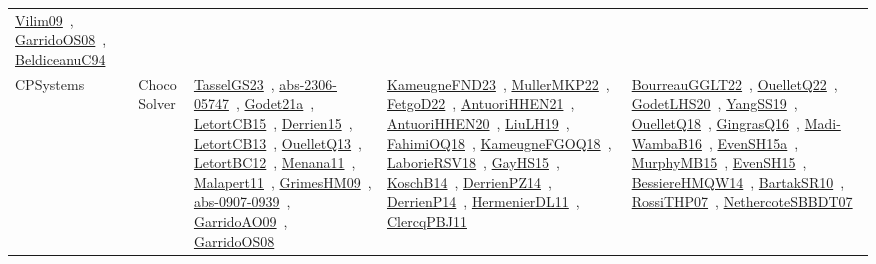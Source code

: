 {\begin{longtable}{lp{3cm}>{\raggedright\arraybackslash}p{6cm}>{\raggedright\arraybackslash}p{6cm}>{\raggedright\arraybackslash}p{8cm}}
\href{works/Vilim09.pdf}{Vilim09}~\cite{Vilim09}, \href{works/GarridoOS08.pdf}{GarridoOS08}~\cite{GarridoOS08}, \href{works/BeldiceanuC94.pdf}{BeldiceanuC94}~\cite{BeldiceanuC94}\\
CPSystems & Choco Solver & \href{works/TasselGS23.pdf}{TasselGS23}~\cite{TasselGS23}, \href{works/abs-2306-05747.pdf}{abs-2306-05747}~\cite{abs-2306-05747}, \href{works/Godet21a.pdf}{Godet21a}~\cite{Godet21a}, \href{works/LetortCB15.pdf}{LetortCB15}~\cite{LetortCB15}, \href{works/Derrien15.pdf}{Derrien15}~\cite{Derrien15}, \href{works/LetortCB13.pdf}{LetortCB13}~\cite{LetortCB13}, \href{works/OuelletQ13.pdf}{OuelletQ13}~\cite{OuelletQ13}, \href{works/LetortBC12.pdf}{LetortBC12}~\cite{LetortBC12}, \href{works/Menana11.pdf}{Menana11}~\cite{Menana11}, \href{works/Malapert11.pdf}{Malapert11}~\cite{Malapert11}, \href{works/GrimesHM09.pdf}{GrimesHM09}~\cite{GrimesHM09}, \href{works/abs-0907-0939.pdf}{abs-0907-0939}~\cite{abs-0907-0939}, \href{works/GarridoAO09.pdf}{GarridoAO09}~\cite{GarridoAO09}, \href{works/GarridoOS08.pdf}{GarridoOS08}~\cite{GarridoOS08} & \href{works/KameugneFND23.pdf}{KameugneFND23}~\cite{KameugneFND23}, \href{works/MullerMKP22.pdf}{MullerMKP22}~\cite{MullerMKP22}, \href{works/FetgoD22.pdf}{FetgoD22}~\cite{FetgoD22}, \href{works/AntuoriHHEN21.pdf}{AntuoriHHEN21}~\cite{AntuoriHHEN21}, \href{works/AntuoriHHEN20.pdf}{AntuoriHHEN20}~\cite{AntuoriHHEN20}, \href{works/LiuLH19.pdf}{LiuLH19}~\cite{LiuLH19}, \href{works/FahimiOQ18.pdf}{FahimiOQ18}~\cite{FahimiOQ18}, \href{works/KameugneFGOQ18.pdf}{KameugneFGOQ18}~\cite{KameugneFGOQ18}, \href{works/LaborieRSV18.pdf}{LaborieRSV18}~\cite{LaborieRSV18}, \href{works/GayHS15.pdf}{GayHS15}~\cite{GayHS15}, \href{works/KoschB14.pdf}{KoschB14}~\cite{KoschB14}, \href{works/DerrienPZ14.pdf}{DerrienPZ14}~\cite{DerrienPZ14}, \href{works/DerrienP14.pdf}{DerrienP14}~\cite{DerrienP14}, \href{works/HermenierDL11.pdf}{HermenierDL11}~\cite{HermenierDL11}, \href{works/ClercqPBJ11.pdf}{ClercqPBJ11}~\cite{ClercqPBJ11} & \href{works/BourreauGGLT22.pdf}{BourreauGGLT22}~\cite{BourreauGGLT22}, \href{works/OuelletQ22.pdf}{OuelletQ22}~\cite{OuelletQ22}, \href{works/GodetLHS20.pdf}{GodetLHS20}~\cite{GodetLHS20}, \href{works/YangSS19.pdf}{YangSS19}~\cite{YangSS19}, \href{works/OuelletQ18.pdf}{OuelletQ18}~\cite{OuelletQ18}, \href{works/GingrasQ16.pdf}{GingrasQ16}~\cite{GingrasQ16}, \href{works/Madi-WambaB16.pdf}{Madi-WambaB16}~\cite{Madi-WambaB16}, \href{works/EvenSH15a.pdf}{EvenSH15a}~\cite{EvenSH15a}, \href{works/MurphyMB15.pdf}{MurphyMB15}~\cite{MurphyMB15}, \href{works/EvenSH15.pdf}{EvenSH15}~\cite{EvenSH15}, \href{works/BessiereHMQW14.pdf}{BessiereHMQW14}~\cite{BessiereHMQW14}, \href{works/BartakSR10.pdf}{BartakSR10}~\cite{BartakSR10}, \href{works/RossiTHP07.pdf}{RossiTHP07}~\cite{RossiTHP07}, \href{works/NethercoteSBBDT07.pdf}{NethercoteSBBDT07}~\cite{NethercoteSBBDT07}\\

\end{longtable}}
